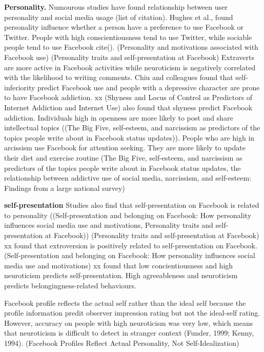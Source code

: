  \textbf{Personality.} Numourous studies have found relationship between user personality and social media usage (list of citation). Hughes et al., found personality influence whether a person have a preference to use Facebook or Twitter. People with high conscientiousness tend to use Twitter, while sociable people tend to use Facebook cite().  (Personality and motivations associated with Facebook use) (Personality traits and self-presentation at Facebook) Extraverts are more active in Facebook activities while neuroticism is negatively correlated with the likelihood to writing comments. Chiu and colleagues found that self-inferiority predict Facebook use and people with a depressive character are prone to have Facebook addiction. xx (Shyness and Locus of Control as Predictors of Internet Addiction and Internet Use) also found that shyness predict Facebook addiction. Individuals high in openness are more likely to post and share intellectual topics ((The Big Five, self-esteem, and narcissism as predictors of the topics people write about in Facebook status updates)). People who are high in arcissism use Facebook for attention seeking. They are more likely to update their diet and exercise routine (The Big Five, self-esteem, and narcissism as predictors of the topics people write about in Facebook status updates, the relationship between addictive use of social media, narcissism, and self-esteem: Findings from a large national survey)

 \textbf{self-presentation} Studies also find that self-presentation on Facebook is related to personality ((Self-presentation and belonging on Facebook: How personality influences social media use and motivations, Personality traits and self-presentation at Facebook)) (Personality traits and self-presentation at Facebook) xx found that extroversion is positively related to self-presentation on Facebook.  (Self-presentation and belonging on Facebook: How personality influences social media use and motivations) xx found that low concientiousness and high neuroticism predicts self-presentation. High agreeableness and neuroticism predicts belongingness-related behaviours.

Facebook profile reflects the actual self rather than the ideal self because the profile information predit observer impression rating but not the ideal-self rating. However, accuracy on people with high neuroticism was very low, which means that neuroticism is difficult to detect in stranger context (Funder, 1999; Kenny, 1994). (Facebook Profiles Reflect Actual Personality, Not Self-Idealization)


